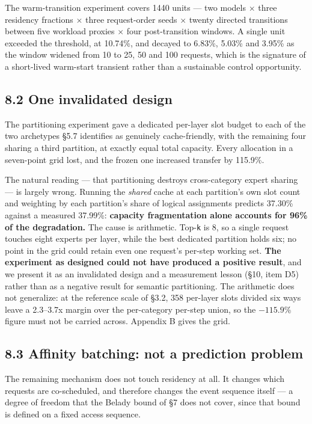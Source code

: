 \documentclass[
  10pt,
  letterpaper,
  10pt]{article}
\begin{document}
The warm-transition experiment covers 1440 units --- two models
\(\times\) three residency fractions \(\times\) three request-order
seeds \(\times\) twenty directed transitions between five workload
proxies \(\times\) four post-transition windows. A single unit exceeded
the threshold, at 10.74\%, and decayed to 6.83\%, 5.03\% and 3.95\% as
the window widened from 10 to 25, 50 and 100 requests, which is the
signature of a short-lived warm-start transient rather than a
sustainable control opportunity.

\subsection{8.2 One invalidated design}\label{one-invalidated-design}

The partitioning experiment gave a dedicated per-layer slot budget to
each of the two archetypes §5.7 identifies as genuinely cache-friendly,
with the remaining four sharing a third partition, at exactly equal
total capacity. Every allocation in a seven-point grid lost, and the
frozen one increased transfer by 115.9\%.

The natural reading --- that partitioning destroys cross-category expert
sharing --- is largely wrong. Running the \emph{shared} cache at each
partition's own slot count and weighting by each partition's share of
logical assignments predicts 37.30\% against a measured 37.99\%:
\textbf{capacity fragmentation alone accounts for 96\% of the
degradation.} The cause is arithmetic. Top-\texttt{k} is 8, so a single
request touches eight experts per layer, while the best dedicated
partition holds six; no point in the grid could retain even one
request's per-step working set. \textbf{The experiment as designed could
not have produced a positive result}, and we present it as an
invalidated design and a measurement lesson (§10, item D5) rather than
as a negative result for semantic partitioning. The arithmetic does not
generalize: at the reference scale of §3.2, 358 per-layer slots divided
six ways leave a 2.3--3.7x margin over the per-category per-step union,
so the \(-115.9\)\% figure must not be carried across. Appendix B gives
the grid.

\subsection{8.3 Affinity batching: not a prediction
problem}\label{affinity-batching-not-a-prediction-problem}

The remaining mechanism does not touch residency at all. It changes
which requests are co-scheduled, and therefore changes the event
sequence itself --- a degree of freedom that the Belady bound of §7 does
not cover, since that bound is defined on a fixed access sequence.
\end{document}
